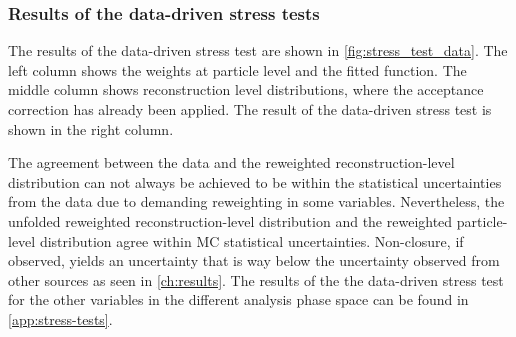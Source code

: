 \subsubsection{Results of the data-driven stress tests}

The results of the data-driven stress test are shown in \cref{fig:stress_test_data}. The left column shows the weights at particle level and the fitted function. The middle column shows reconstruction level 
distributions, where the acceptance correction has already been applied. The result of the data-driven stress test is shown in the right column. 

The agreement between the data and the reweighted reconstruction-level distribution can not always be achieved to be within the statistical uncertainties from the data due to demanding reweighting in some variables. Nevertheless, the unfolded reweighted reconstruction-level distribution and the reweighted particle-level distribution agree within MC statistical uncertainties.
Non-closure, if observed, yields an uncertainty that is way below the uncertainty observed from other sources as seen in \cref{ch:results}.
The results of the the data-driven stress test for the other variables in the different analysis phase space can be found in \cref{app:stress-tests}.


